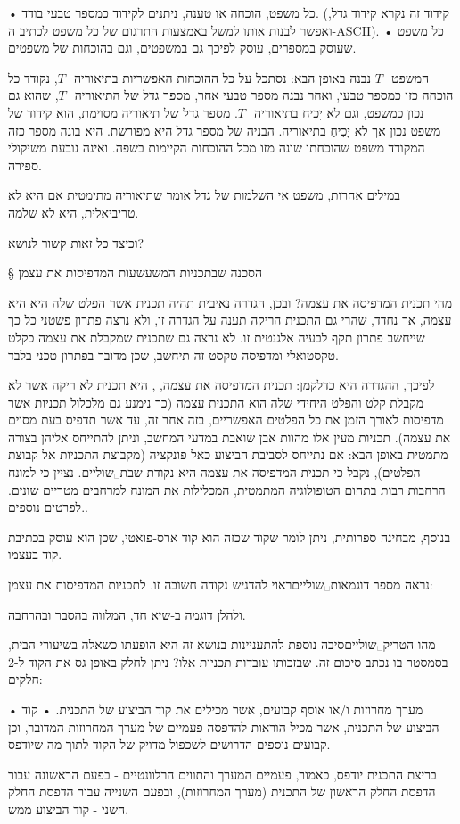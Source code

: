 \begin{itemize}
• כל משפט, הוכחה או טענה, ניתנים לקידוד כמספר טבעי בודד. (קידוד זה נקרא קידוד גדל, ואפשר לבנות אותו למשל באמצעות התרגום של כל משפט לכתיב ה-ASCII).
• כל משפט שעוסק במספרים, עוסק לפיכך גם במשפטים, וגם בהוכחות של משפטים.
\end{itemize}
 המשפט~$ T~$ נבנה באופן הבא: נסתכל על כל ההוכחות האפשריות בתיאוריה~$ T~$, נקודד
 כל הוכחה כזו כמספר טבעי, ואחר נבנה מספר טבעי אחר, מספר גדל של התיאוריה~$ T~$,
 שהוא גם נכון כמשפט, וגם לא יָכִיחַ בתיאוריה~$ T~$. מספר גדל של תיאוריה מסוימת,
 הוא קידוד של משפט נכון אך לא יָכִיחַ בתיאוריה. הבניה של מספר גדל היא מפורשת. היא
 בונה מספר כזה המקודד משפט שהוכחתו שונה מזו מכל ההוכחות הקיימות בשפה. ואינה
 נובעת משיקולי ספירה.

 במילים אחרות, משפט אי השלמות של גדל אומר שתיאוריה מתימטית אם היא לא טריביאלית,
 היא לא שלמה.

וכיצד כל זאות קשור לנושא?
\newpage

§ הסכנה שבתכניות המשעשעות המדפיסות את עצמן

מהי תכנית המדפיסה את עצמה? ובכן, הגדרה נאיבית תהיה תכנית אשר הפלט שלה היא היא
עצמה, אך נחדד, שהרי גם התכנית הריקה תענה על הגדרה זו, ולא נרצה פתרון פשטני כל
כך שייחשב פתרון תקף לבעיה אלגנטית זו. לא נרצה גם שתכנית שמקבלת את עצמה כקלט
טקסטואלי ומדפיסה טקסט זה תיחשב, שכן מדובר בפתרון טכני בלבד.

לפיכך, ההגדרה היא כדלקמן: תכנית המדפיסה את עצמה, , היא תכנית לא ריקה
אשר לא מקבלת קלט והפלט היחידי שלה הוא התכנית עצמה (כך נימנע גם מלכלול תכניות
אשר מדפיסות לאורך הזמן את כל הפלטים האפשריים, בזה אחר זה, עד אשר תדפיס בעת
מסוים את עצמה). תכניות מעין אלו מהוות אבן שואבת במדעי המחשב, וניתן להתייחס
אליהן בצורה מתמטית באופן הבא: אם נתייחס לסביבת הביצוע כאל פונקציה (מקבוצת
התכניות אל קבוצת הפלטים), נקבל כי תכנית המדפיסה את עצמה היא נקודת
שבת␣שוליים{. נציין כי למונח הרחבות רבות בתחום הטופולוגיה
המתמטית, המכלילות את המונח למרחבים מטריים שונים. לפרטים נוספים.}.

בנוסף, מבחינה ספרותית, ניתן לומר שקוד שכזה הוא קוד ארס-פואטי, שכן הוא עוסק
בכתיבת קוד בעצמו.

נראה מספר דוגמאות␣שוליים{ראוי להדגיש נקודה חשובה זו.} לתכניות המדפיסות את עצמן:





ולהלן דוגמה ב-שיא חד, המלווה בהסבר ובהרחבה.

מהו הטריק␣שוליים{סיבה נוספת להתעניינות בנושא זה היא הופעתו כשאלה בשיעורי הבית, בסמסטר בו נכתב סיכום זה.} שבזכותו עובדות תכניות אלו? ניתן לחלק באופן גס את הקוד ל-2 חלקים:
\begin{enumerate}
• מערך מחרוזות ו/או אוסף קבועים, אשר מכילים את קוד הביצוע של התכנית.
• קוד הביצוע של התכנית, אשר מכיל הוראות להדפסה פעמיים של מערך המחרוזות המדובר, וכן קבועים נוספים הדרושים לשכפול מדויק של הקוד לתוך מה שיודפס.
\end{enumerate}
בריצת התכנית יודפס, כאמור, פעמיים המערך והתווים הרלוונטיים - בפעם הראשונה עבור הדפסת החלק הראשון של התכנית (מערך המחרוזות), ובפעם השנייה עבור הדפסת החלק השני - קוד הביצוע ממש.

